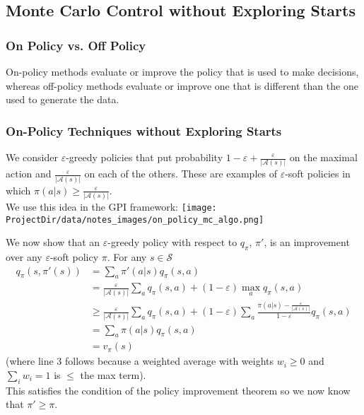 \subsection{Monte Carlo Control without Exploring Starts}
\subsubsection*{On Policy vs. Off Policy}
On-policy methods evaluate or improve the policy that is used to make decisions, whereas off-policy methods evaluate or improve one that is different than the one used to generate the data.

\subsubsection*{On-Policy Techniques without Exploring Starts}
We consider $\varepsilon$-greedy policies that put probability $1 - \varepsilon + \frac{\varepsilon}{|\mathcal{A}(s)|}$ on the maximal action and $\frac{\varepsilon}{|\mathcal{A}(s)|}$ on each of the others. These are examples of $\varepsilon$-soft policies in which $\pi(a|s) \geq \frac{\varepsilon}{|\mathcal{A}(s)|}$.\\

We use this idea in the GPI framework:
\texttt{[image: \\ProjectDir/data/notes\_images/on\_policy\_mc\_algo.png]}

We now show that an $\varepsilon$-greedy policy with respect to $q_\pi$, $\pi'$, is an improvement over any $\varepsilon$-soft policy $\pi$. For any $s \in \mathcal{S}$
\begin{align}
    q_\pi(s, \pi'(s)) &= \sum_a \pi'(a|s) q_\pi(s, a) \\ 
                      &= \frac{\varepsilon}{|\mathcal{A}(s)|} \sum_a q_\pi(s, a) + (1 - \varepsilon)\max_a q_\pi(s, a) \\
                      &\geq \frac{\varepsilon}{|\mathcal{A}(s)|} \sum_a q_\pi(s, a) + (1 - \varepsilon)\sum_a\frac{\pi(a|s) - \frac{\varepsilon}{|\mathcal{A}(s)|}}{1 - \varepsilon} q_\pi(s, a) \\
                      &= \sum_a \pi(a|s) q_\pi(s, a)\\
                      &= v_\pi(s)
\end{align}
(where line 3 follows because a weighted average with weights $w_i \geq 0$ and $\sum_i w_i = 1$ is $\leq$ the max term).\\

This satisfies the condition of the policy improvement theorem so we now know that $\pi' \geq \pi$.\\

